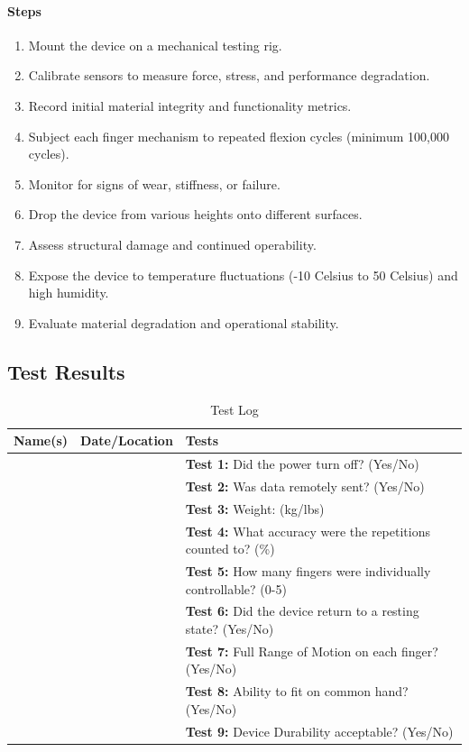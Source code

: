 \documentclass{article}
\begin{document}
\paragraph{Steps}
\begin{enumerate}
    \item Mount the device on a mechanical testing rig.
    \item Calibrate sensors to measure force, stress, and performance degradation.
    \item Record initial material integrity and functionality metrics.
    \item Subject each finger mechanism to repeated flexion cycles (minimum 100,000 cycles).
    \item Monitor for signs of wear, stiffness, or failure.
    \item Drop the device from various heights onto different surfaces. 
    \item Assess structural damage and continued operability.
    \item Expose the device to temperature fluctuations (-10 Celsius to 50 Celsius) and high humidity.
    \item Evaluate material degradation and operational stability.
\end{enumerate}

\subsection{Test Results}

\begin{table}[H]
    \hspace*{-1 cm}
    \centering
    \begin{tabular}{|c|c|p{8cm}|}
        \hline
        \textbf{Name(s)} & \textbf{Date/Location} & \textbf{Tests} \\
        \hline
        & & \textbf{Test 1:} Did the power turn off? (Yes/No) \\
        \hline
        & & \textbf{Test 2:} Was data remotely sent? (Yes/No) \\
        \hline
        & & \textbf{Test 3:} Weight: (kg/lbs) \\ 
        \hline
        & & \textbf{Test 4:} What accuracy were the repetitions counted to? (\%) \\
        \hline
        & & \textbf{Test 5:} How many fingers were individually controllable? (0-5) \\
        \hline
        & & \textbf{Test 6:} Did the device return to a resting state? (Yes/No) \\
        \hline
        & & \textbf{Test 7:} Full Range of Motion on each finger? (Yes/No) \\
        \hline
        & & \textbf{Test 8:} Ability to fit on common hand? (Yes/No) \\
        \hline
        & & \textbf{Test 9:} Device Durability acceptable? (Yes/No) \\
        \hline
    \end{tabular}
    \caption{Test Log}
    \label{tab:test_log}
\end{table}
\end{document}
